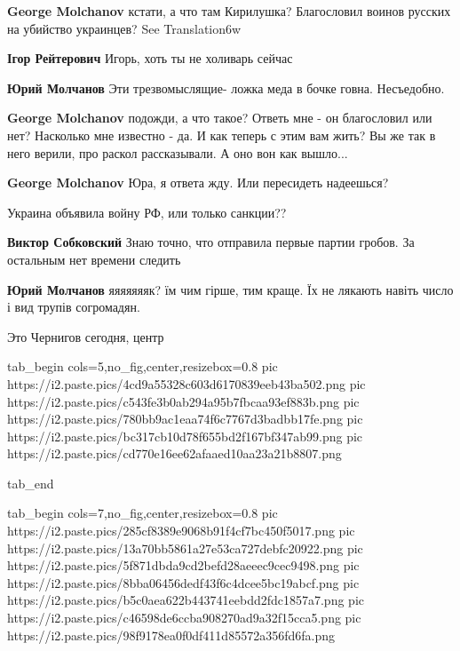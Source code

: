 \begin{itemize}
\begin{itemize}

\textbf{George Molchanov} кстати, а что там Кирилушка? Благословил воинов русских на убийство украинцев?
See Translation6w

\textbf{Ігор Рейтерович} Игорь, хоть ты не холиварь сейчас

\textbf{Юрий Молчанов} Эти трезвомыслящие- ложка меда в бочке говна. Несъедобно.


\textbf{George Molchanov} подожди, а что такое? Ответь мне - он благословил или нет? Насколько мне известно - да. И как теперь с этим вам жить? Вы же так в него верили, про раскол рассказывали. А оно вон как вышло...

\textbf{George Molchanov} Юра, я ответа жду. Или пересидеть надеешься?

Украина объявила войну РФ, или только санкции??

\textbf{Виктор Собковский} Знаю точно, что отправила первые партии гробов. За остальным нет времени следить

\textbf{Юрий Молчанов} яяяяяяяк? їм чим гірше, тим краще. Їх не лякають навіть число і вид трупів согромадян.
\end{itemize} %


Это Чернигов сегодня, центр

\ifcmt
  tab_begin cols=5,no_fig,center,resizebox=0.8
     pic https://i2.paste.pics/4cd9a55328c603d6170839eeb43ba502.png
		 pic https://i2.paste.pics/c543fe3b0ab294a95b7fbcaa93ef883b.png
		 pic https://i2.paste.pics/780bb9ac1eaa74f6c7767d3badbb17fe.png
		 pic https://i2.paste.pics/bc317cb10d78f655bd2f167bf347ab99.png
		 pic https://i2.paste.pics/cd770e16ee62afaaed10aa23a21b8807.png

  tab_end
\fi


\ifcmt
  tab_begin cols=7,no_fig,center,resizebox=0.8
	   pic https://i2.paste.pics/285cf8389e9068b91f4cf7bc450f5017.png
		 pic https://i2.paste.pics/13a70bb5861a27e53ca727debfc20922.png
		 pic https://i2.paste.pics/5f871dbda9cd2befd28aeeec9cec9498.png
		 pic https://i2.paste.pics/8bba06456dedf43f6c4dcee5bc19abcf.png
		 pic https://i2.paste.pics/b5c0aea622b443741eebdd2fdc1857a7.png
		 pic https://i2.paste.pics/c46598de6ccba908270ad9a32f15cca5.png
		 pic https://i2.paste.pics/98f9178ea0f0df411d85572a356fd6fa.png


\end{itemize}
